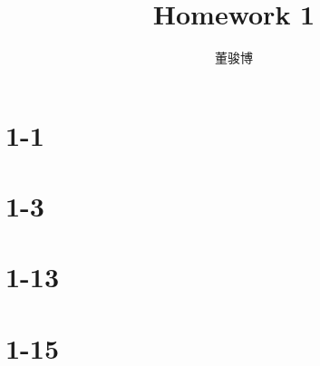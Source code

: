 \documentclass[onecolumn,oneside]{SUSTechHomework}
\author{董骏博}
\title{Homework 1}
\begin{document}
  \maketitle
  
  \section*{1-1}
  
  \section*{1-3}
  
  \section*{1-13}
  
  \section*{1-15}
  
\end{document}
